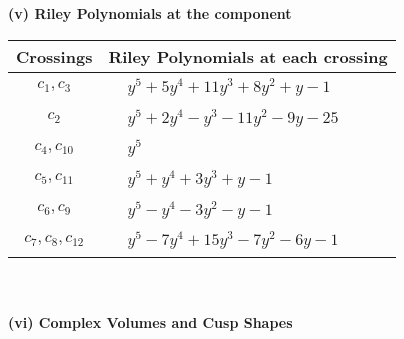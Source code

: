 \documentclass[1p]{elsarticle_modified}
\theoremstyle{definition}
\begin{document}
\newpage\renewcommand{\arraystretch}{1}
\flushleft \textbf{(v) Riley Polynomials at the component}\newline \\
\begin{tabular}{m{50pt}|m{274pt}}
Crossings & \hspace{64pt}Riley Polynomials at each crossing \\
\hline $$\begin{aligned}c_{1},c_{3}\end{aligned}$$&$\begin{aligned}
&y^5+5 y^4+11 y^3+8 y^2+y-1
\end{aligned}$\\
\hline $$\begin{aligned}c_{2}\end{aligned}$$&$\begin{aligned}
&y^5+2 y^4- y^3-11 y^2-9 y-25
\end{aligned}$\\
\hline $$\begin{aligned}c_{4},c_{10}\end{aligned}$$&$\begin{aligned}
&y^5
\end{aligned}$\\
\hline $$\begin{aligned}c_{5},c_{11}\end{aligned}$$&$\begin{aligned}
&y^5+y^4+3 y^3+y-1
\end{aligned}$\\
\hline $$\begin{aligned}c_{6},c_{9}\end{aligned}$$&$\begin{aligned}
&y^5- y^4-3 y^2- y-1
\end{aligned}$\\
\hline $$\begin{aligned}c_{7},c_{8},c_{12}\end{aligned}$$&$\begin{aligned}
&y^5-7 y^4+15 y^3-7 y^2-6 y-1
\end{aligned}$\\
\hline
\end{tabular}\\~\\
\newpage\flushleft \textbf{(vi) Complex Volumes and Cusp Shapes}
\end{document}
